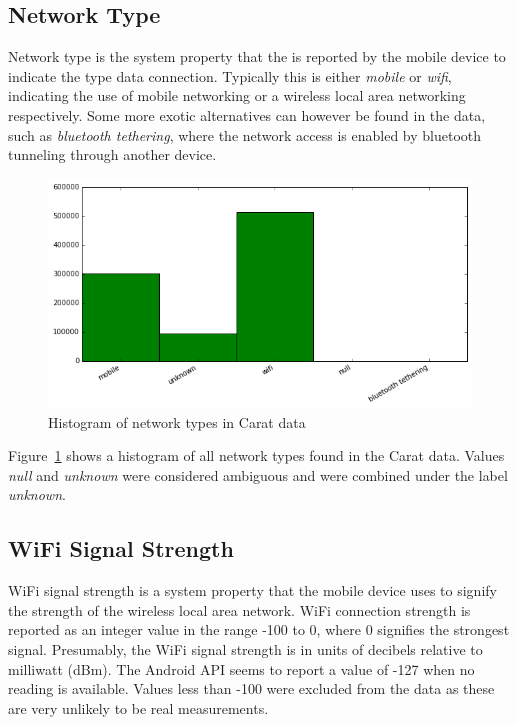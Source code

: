 \subsection{Network Type}  

Network type is the system property that the is reported by the mobile device to indicate the type data connection. Typically this is either \textit{mobile} or \textit{wifi}, indicating the use of mobile networking or a wireless local area networking respectively. Some more exotic alternatives can however be found in the data, such as \textit{bluetooth tethering}, where the network access is enabled by bluetooth tunneling through another device.

\begin{figure} %
	\centering
	\includegraphics[width=\textwidth]{images/carat-data/network_type.png}
	\caption{Histogram of network types in Carat data}
	\label{figure:carat-data-net-type}
\end{figure}   

Figure~\ref{figure:carat-data-net-type} shows a histogram of all network types found in the Carat data. Values \textit{null} and \textit{unknown} were considered ambiguous and were combined under the label \textit{unknown}.
 

\subsection{WiFi Signal Strength}

WiFi signal strength is a system property that the mobile device uses to signify the strength of the wireless local area network. WiFi connection strength is reported as an integer value in the range -100 to 0, where 0 signifies the strongest signal. Presumably, the WiFi signal strength is in units of decibels relative to milliwatt (dBm). The Android API seems to report a value of -127 when no reading is available. Values less than -100 were excluded from the data as these are very unlikely to be real measurements.

